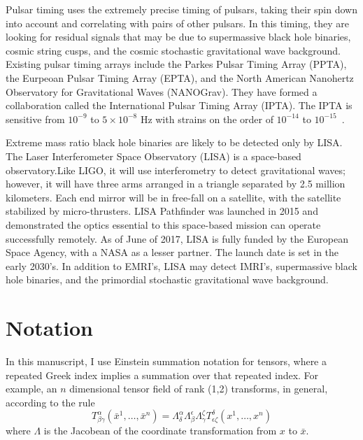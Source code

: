Pulsar timing uses the extremely precise timing of pulsars, taking their spin down into account and correlating with pairs of other pulsars. In this timing, they are looking for residual signals that may be due to supermassive black hole binaries, cosmic string cusps, and the cosmic stochastic gravitational wave background. Existing pulsar timing arrays include the Parkes Pulsar Timing Array (PPTA), the Eurpeoan Pulsar Timing Array (EPTA), and the North American Nanohertz Observatory for Gravitational Waves (NANOGrav). They have formed a collaboration called the International Pulsar Timing Array (IPTA). The IPTA is sensitive from $10^{-9}$ to $5\times10^{-8}$ Hz with strains on the order of $10^{-14}$ to $10^{-15}$~\cite{hobbs_dai}.



Extreme mass ratio black hole binaries are likely to be detected only by LISA. The Laser Interferometer Space Observatory (LISA) is a space-based observatory.Like LIGO, it will use interferometry to detect gravitational waves; however, it will have three arms arranged in a triangle separated by 2.5 million kilometers. Each end mirror will be in free-fall on a satellite, with the satellite stabilized by micro-thrusters. LISA Pathfinder was launched in 2015 and demonstrated the optics essential to this space-based mission can operate successfully remotely. As of June of 2017, LISA is fully funded by the European Space Agency, with a NASA as a lesser partner. The launch date is set in the early 2030's. In addition to EMRI's, LISA may detect IMRI's, supermassive black hole binaries, and the primordial stochastic gravitational wave background.


\section{Notation}
In this manuscript, I use Einstein summation notation for tensors, where a repeated Greek index implies a summation over that repeated index. For example, an $n$ dimensional tensor field of rank (1,2) transforms, in general, according to the rule
\begin{equation}
  T^\alpha_{\beta\gamma}(\bar{x}^1,\ldots,\bar{x}^n)=\Lambda^\alpha_\delta\Lambda^\epsilon_\beta\Lambda^\zeta_\gamma T^\delta_{\epsilon\zeta}(x^1,\ldots,x^n)
\end{equation}
where $\Lambda$ is the Jacobean of the coordinate transformation from $x$ to $\bar{x}$. 

